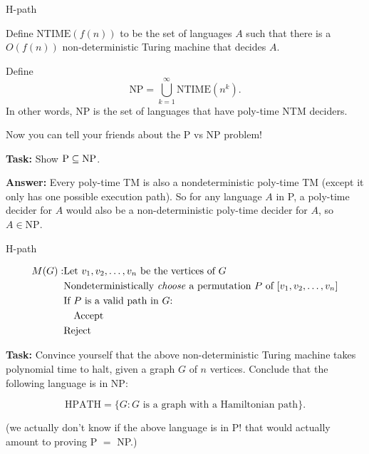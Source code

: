 \documentclass{beamer}
\begin{document}
\begin{frame}{H-path}

Define $\text{NTIME}(f(n))$ to be the set of languages $A$ such that there is a $O(f(n))$ non-deterministic Turing machine that decides $A$.

Define $$\text{NP} = \bigcup_{k = 1}^\infty \text{NTIME}(n^k).$$
In other words, NP is the set of languages that have poly-time NTM deciders.

\vspace{2mm}

Now you can tell your friends about the P vs NP problem!

\textbf{Task:} Show $\text P \subseteq \text{NP}$.

\pause
\textbf{Answer:} Every poly-time TM is also a nondeterministic poly-time TM (except it only has one possible execution path). So for any language $A$ in P, a poly-time decider for $A$ would also be a non-deterministic poly-time decider for $A$, so $A \in \text{NP}$.

\end{frame}


\begin{frame}{H-path}

\begin{align*}
M(G):& \text{Let $v_1, v_2, \ldots, v_n$ be the vertices of $G$}\\
&\text{Nondeterministically \textit{choose} a permutation $P$ of $[v_1, v_2, \ldots, v_n]$}\\
&\text{If $P$ is a valid path in $G$:}\\
&\quad \text{Accept}\\
&\text{Reject}
\end{align*}

\textbf{Task:} Convince yourself that the above non-deterministic Turing machine takes polynomial time to halt, given a graph $G$ of $n$ vertices. Conclude that the following language is in NP:

$$\text{HPATH} = \{G: \text{$G$ is a graph with a Hamiltonian path}\}.$$

(we actually don't know if the above language is in P! that would actually amount to proving P $=$ NP.)

\end{frame}
\end{document}
